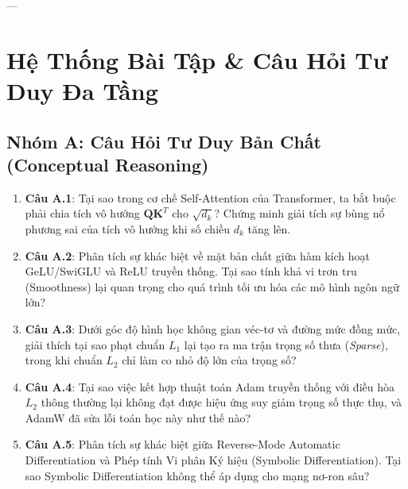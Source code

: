 ---

\section{Hệ Thống Bài Tập \& Câu Hỏi Tư Duy Đa Tầng}
\label{sec:ch04-exercises}

\subsection{Nhóm A: Câu Hỏi Tư Duy Bản Chất (Conceptual Reasoning)}
\begin{enumerate}
  \item \textbf{Câu A.1}: Tại sao trong cơ chế Self-Attention của Transformer, ta bắt buộc phải chia tích vô hướng $\mathbf{Q}\mathbf{K}^T$ cho $\sqrt{d_k}$? Chứng minh giải tích sự bùng nổ phương sai của tích vô hướng khi số chiều $d_k$ tăng lên.
  \item \textbf{Câu A.2}: Phân tích sự khác biệt về mặt bản chất giữa hàm kích hoạt GeLU/SwiGLU và ReLU truyền thống. Tại sao tính khả vi trơn tru (Smoothness) lại quan trọng cho quá trình tối ưu hóa các mô hình ngôn ngữ lớn?
  \item \textbf{Câu A.3}: Dưới góc độ hình học không gian véc-tơ và đường mức đồng mức, giải thích tại sao phạt chuẩn $L_1$ lại tạo ra ma trận trọng số thưa (\textit{Sparse}), trong khi chuẩn $L_2$ chỉ làm co nhỏ độ lớn của trọng số?
  \item \textbf{Câu A.4}: Tại sao việc kết hợp thuật toán Adam truyền thống với điều hòa $L_2$ thông thường lại không đạt được hiệu ứng suy giảm trọng số thực thụ, và AdamW đã sửa lỗi toán học này như thế nào?
  \item \textbf{Câu A.5}: Phân tích sự khác biệt giữa Reverse-Mode Automatic Differentiation và Phép tính Vi phân Ký hiệu (Symbolic Differentiation). Tại sao Symbolic Differentiation không thể áp dụng cho mạng nơ-ron sâu?
\end{enumerate}

